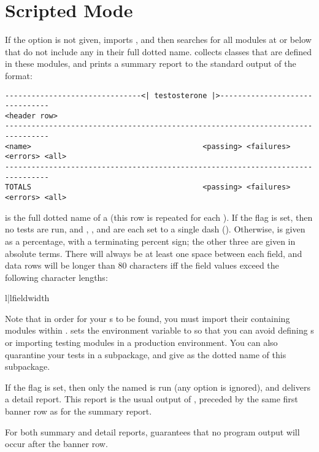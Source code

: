 \chapter{Scripted Mode \label{scripted}}

If the  option is not given, 
imports , and then searches  for all modules at or
below  that do not include any  in their full dotted
name.  collects  classes that are defined
in these modules, and prints a summary report to the standard output of the
format:


\begin{verbatim}
-------------------------------<| testosterone |>-------------------------------
<header row>
--------------------------------------------------------------------------------
<name>                                       <passing> <failures> <errors> <all>
--------------------------------------------------------------------------------
TOTALS                                       <passing> <failures> <errors> <all>
\end{verbatim}

 is the full dotted name of a  (this row is
repeated for each ). If the  flag is set,
then no tests are run, and , , and
 are each set to a single dash (\code{-}). Otherwise,
 is given as a percentage, with a terminating percent sign; the
other three are given in absolute terms. There will always be at least one space
between each field, and data rows will be longer than 80 characters iff the
field values exceed the following character lengths:

\begin{tableii}{l|l}{}{field}{width}
\end{tableii}

Note that in order for your s to be found, you must import their
containing modules within .  sets the
 environment variable to  so that you
can avoid defining s or importing testing modules in a
production environment. You can also quarantine your tests in a subpackage, and
give  as the dotted name of this subpackage.

If the  flag is set, then only the named
 is run (any  option is ignored), and
 delivers a detail report. This report is the usual output
of , preceded by the same first banner row as for
the summary report.

For both summary and detail reports,  guarantees that no
program output will occur after the banner row.